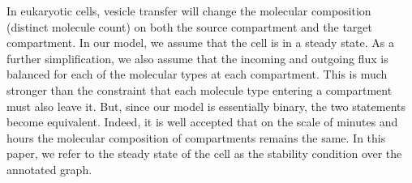 In eukaryotic cells, vesicle transfer will change the molecular composition (distinct molecule count) on both the source compartment and the target compartment. 
%
In our model, we assume that the cell is in a steady state. As a further simplification, we also assume that the incoming and outgoing flux is balanced for each of the molecular types at each compartment.
%
This is much stronger than the constraint that each molecule type entering a compartment must also leave it.
%
But, since our model is essentially binary, the two statements become equivalent. 
%
Indeed, it is well accepted that on the scale of minutes and hours the molecular composition of compartments remains the same. 
%
In this paper, we refer to the steady state of the cell \cite{mani2016stacking} as the stability condition over the annotated graph.


